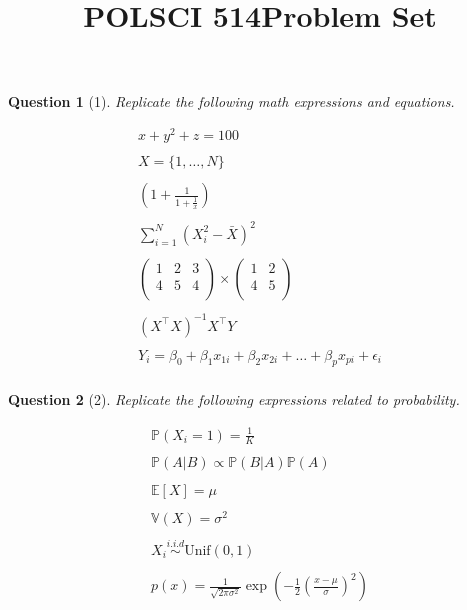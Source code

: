 \documentclass[11pt]{article}
\title{\vspace{-50pt}
\Huge \name
\\\vspace{20pt}
\huge POLSCI 514\hfill Problem Set \hw}
\author{}
\date{}
\theoremstyle{quest}
\newtheorem*{question}{Question}
\begin{document}
\maketitle

\begin{question}[1]
Replicate the following math expressions and equations.
\end{question}

\begin{equation*}
\begin{split}
  x + y^2 + z = 100 \\ 
  \\
  X = \{1, \ldots, N\} \\
  \\
  \left( 1 + \frac{1}{1 + \frac{1}{x}} \right) \\
  \\
  \sum_{i=1}^{N} (X_i^2 - \bar{X})^2 \\ 
  \\
  \begin{pmatrix}
    1 & 2 & 3 \\
    4 & 5 & 4 \\
  \end{pmatrix}
  \times
  \begin{pmatrix}
    1 & 2  \\
    4 & 5  \\
  \end{pmatrix} \\
  \\
  (X^\intercal X)^{-1}X^\intercal Y \\
  \\
  Y_i = \beta_0 + \beta_1 x_{1i} + \beta_2 x_{2i} + \ldots + \beta_p x_{pi} + \epsilon_i \\ 
\end{split}
\end{equation*}

\clearpage
\begin{question}[2]
Replicate the following expressions related to probability.
\end{question}

\begin{equation*}
\begin{split}
  \mathbb{P}(X_i = 1) = \frac{1}{K} \\
  \\
  \mathbb{P}(A \vert B) \propto \mathbb{P}(B \vert A) \mathbb{P}(A) \\
  \\
  \mathbb{E}[X] = \mu \\
  \\
  \mathbb{V}(X) = \sigma^2 \\
  \\
  X_i \stackrel{i.i.d}{\sim} \text{Unif}(0, 1) \\
  \\
  p(x) = \frac{1}{\sqrt{2\pi\sigma^2}}\exp \left(- \frac{1}{2}(\frac{x - \mu}{\sigma})^2\right) \\
\end{split}
\end{equation*}


\end{document}
